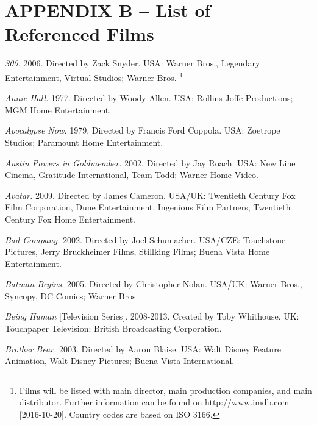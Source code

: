 \section{{APPENDIX B – List of Referenced Films}}\label{appendix_b}
\sloppy

\medskip\noindent\textit{300.} 2006. Directed by Zack Snyder. USA: Warner Bros., Legendary Entertainment, Virtual Studios; Warner Bros.
\footnote{Films will be listed with main director, main production companies, and main distributor. Further information can be found on http://www.imdb.com [2016-10-20]. Country codes are based on ISO 3166.}



\medskip\noindent\textit{Annie Hall.} 1977. Directed by Woody Allen. USA: Rollins-Joffe Productions; MGM Home Entertainment.



\medskip\noindent\textit{Apocalypse Now.} 1979. Directed by Francis Ford Coppola. USA: Zoetrope Studios; Paramount Home Entertainment.



\medskip\noindent\textit{Austin Powers in Goldmember.} 2002. Directed by Jay Roach. USA: New Line Cinema, Gratitude International, Team Todd; Warner Home Video.



\medskip\noindent\textit{Avatar.} 2009. Directed by James Cameron. USA/UK: Twentieth Century Fox Film Corporation, Dune Entertainment, Ingenious Film Partners; Twentieth Century Fox Home Entertainment.



\medskip\noindent\textit{Bad Company.} 2002. Directed by Joel Schumacher. USA/CZE: Touchstone Pictures, Jerry Bruckheimer Films, Stillking Films; Buena Vista Home Entertainment.



\medskip\noindent\textit{Batman Begins.} 2005. Directed by Christopher Nolan. USA/UK: Warner Bros., Syncopy, DC Comics; Warner Bros.



\medskip\noindent\textit{Being Human} [Television Series]. 2008-2013. Created by Toby Whithouse. UK: Touchpaper Television; British Broadcasting Corporation.



\medskip\noindent\textit{Brother Bear.} 2003. Directed by Aaron Blaise. USA: Walt Disney Feature Animation, Walt Disney Pictures; Buena Vista International.



